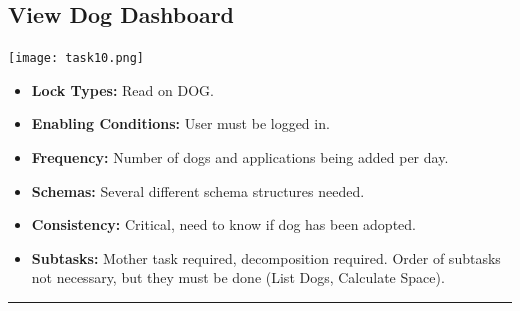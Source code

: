 \documentclass{article}
\begin{document}
\subsection{View Dog Dashboard}
\begin{center}
    \texttt{[image: task10.png]}
\end{center}
\begin{itemize}
    \item \textbf{Lock Types:} Read on DOG.
    \item \textbf{Enabling Conditions:} User must be logged in.
    \item \textbf{Frequency:} Number of dogs and applications being added per day.
    \item \textbf{Schemas:} Several different schema structures needed.
    \item \textbf{Consistency:} Critical, need to know if dog has been adopted.
    \item \textbf{Subtasks:} Mother task required, decomposition required. Order of subtasks not necessary, but they must be done (List Dogs, Calculate Space).
\end{itemize}
\noindent\rule{8cm}{0.4pt}
\end{document}
